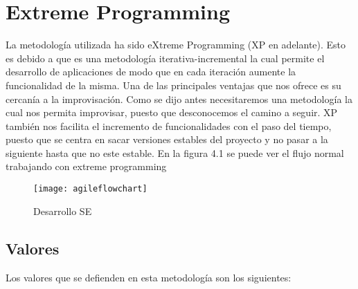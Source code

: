 \section{Extreme Programming}

La metodología utilizada ha sido eXtreme Programming (XP en adelante). Esto es debido a que es una
metodología iterativa-incremental la cual permite el desarrollo de aplicaciones de modo que en cada
iteración aumente la funcionalidad de la misma. Una de las principales ventajas que nos ofrece
es su cercanía a la improvisación. Como se dijo antes necesitaremos una metodología la cual
nos permita improvisar, puesto que desconocemos el camino a seguir. XP también nos facilita
el incremento de funcionalidades con el paso del tiempo, puesto que se centra en sacar versiones
estables del proyecto y no pasar a la siguiente hasta que no este estable. En la figura 4.1 se
puede ver el flujo normal trabajando con extreme programming


\begin{figure}[htb]
  \centering
    \texttt{[image: agileflowchart]}
  \caption[Desarrollo SE]{Desarrollo SE}
  \label{fig:Desarrollo Sistema Experto}
\end{figure}



\subsection{Valores}

Los valores que se defienden en esta metodología son los siguientes:

